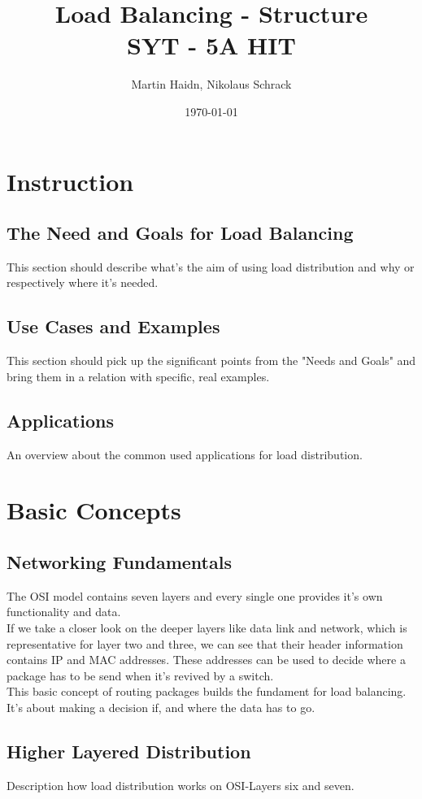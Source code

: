 \documentclass[12p]{article}
\author{Martin Haidn, Nikolaus Schrack}
\title{Load Balancing - Structure\\SYT - 5A HIT}
\date{\today}
\begin{document}
	\maketitle
	
	\newpage
	\tableofcontents
	
	\newpage
	\section{Instruction}
	\subsection{The Need and Goals for Load Balancing}
	This section should describe what's the aim of using load distribution and why or respectively where it's needed.
	\subsection{Use Cases and Examples}
	This section should pick up the significant points from the "Needs and Goals" and bring them in a relation with specific, real examples.
	\subsection{Applications}
	An overview about the common used applications for load distribution.
	
	\newpage
	\section{Basic Concepts}
	\subsection{Networking Fundamentals}
	The OSI model contains seven layers and every single one provides it's own functionality and data.\\
	If we take a closer look on the deeper layers like data link and network, which is representative for layer two and three, we can see that their header information contains IP and MAC addresses. These addresses can be used to decide where a package has to be send when it's revived by a switch.\\
	This basic concept of routing packages builds the fundament for load balancing. It's about making a decision if, and where the data has to go. \cite{lb_SFC}
	\subsection{Higher Layered Distribution}
	Description how load distribution works on OSI-Layers six and seven.
\end{document}
